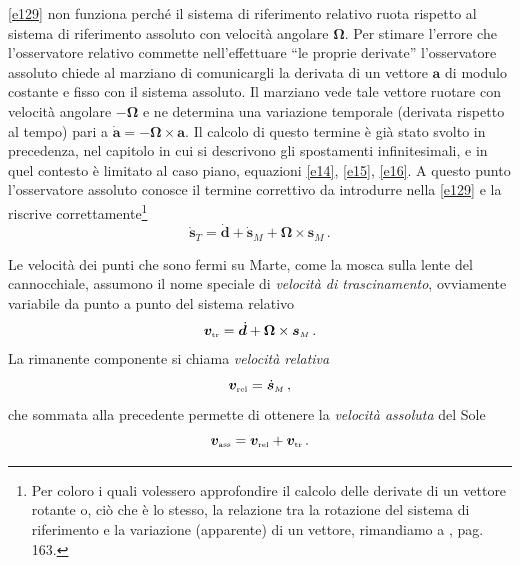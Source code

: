\ref{e129} non funziona perch\'e il sistema di riferimento relativo ruota rispetto
al sistema di riferimento assoluto con velocit\`a angolare $\bm \Omega$. Per  stimare
 l'errore
che l'osservatore relativo commette nell'effettuare ``le proprie derivate'' l'osservatore
assoluto chiede al marziano di comunicargli
la derivata di un vettore $\bm a$
di modulo costante e fisso con il sistema assoluto.
Il marziano vede tale vettore
ruotare con velocit\`a angolare $-\bm \Omega$ e ne
determina una variazione temporale (derivata rispetto al tempo)
 pari a $\dot{\bm a}= - {\bm \Omega}\times {\bm a}$.
\noindent Il calcolo di questo termine \`e gi\`a stato svolto in precedenza, nel capitolo
in cui si descrivono gli spostamenti infinitesimali, e in
quel contesto \`e limitato al caso
piano, equazioni \ref{e14}, \ref{e15}, \ref{e16}.
A questo punto l'osservatore assoluto conosce il termine correttivo da introdurre 
nella \ref{e129} e la riscrive correttamente\footnote
{
Per coloro i quali volessero approfondire il calcolo delle
derivate di un vettore rotante o, ci\`o che \`e lo stesso, la relazione
tra la rotazione del sistema di riferimento e la variazione (apparente)
di un vettore, rimandiamo a \cite{finzi}, pag. 163.
}
\begin{equation}
\dot{\bm{s}}_{\scriptscriptstyle{T}}=
	\dot{\bm{d}}+
\dot{\bm{s}}_{\scriptscriptstyle{M}}+
 {\bm \Omega}\times 
	\bm{s}_{\scriptscriptstyle{M}}\,.
\label{e130}
\end{equation}

\noindent Le velocit\`a dei punti che sono fermi su Marte, come la mosca sulla lente del
cannocchiale, assumono il nome speciale di {\em velocit\`a di trascinamento}, ovviamente variabile da punto a punto del sistema relativo
\begin{equation}
{\bm v}_{\scriptscriptstyle{{\rm tr}}}=
	\dot{\bm{d}}+
 {\bm \Omega}\times 
	\bm{s}_{\scriptscriptstyle{M}}\,.
\label{e131}
\end{equation}
\noindent La rimanente componente si chiama {\em velocit\`a relativa}
\begin{equation}
{\bm v}_{\scriptscriptstyle{{\rm rel}}}=
\dot{\bm{s}}_{\scriptscriptstyle{M}}\,,
\label{e132}
\end{equation}
\noindent che sommata alla precedente permette di ottenere
la {\em velocit\`a assoluta}
del Sole 
\begin{equation}
{\bm v}_{\scriptscriptstyle{{\rm ass}}}=
{\bm v}_{\scriptscriptstyle{{\rm rel}}}+
{\bm v}_{\scriptscriptstyle{{\rm tr}}}\,.
\label{e133}
\end{equation}
